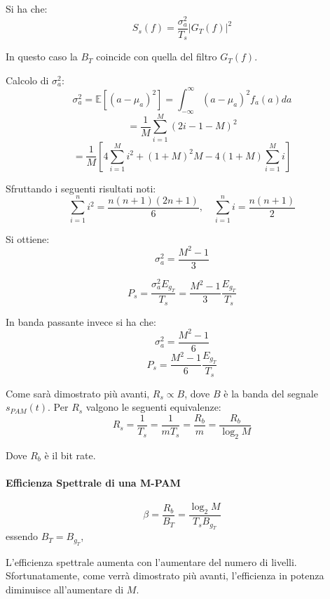 Si ha che:
\[
    S_s(f) = \frac{\sigma_a^2}{T_s} |G_T(f)|^2
\]

In questo caso la $B_T$ coincide con quella del filtro $G_T(f)$.

Calcolo di $\sigma_a^2$:
\[
    \sigma_a^2 = \mathbb{E} \left[ (a - \mu_a)^2 \right] = \int_{-\infty}^{\infty} (a - \mu_a)^2 f_a(a) da
\]
\[
    = \frac{1}{M} \sum_{i=1}^{M} (2i - 1 - M)^2
\]
\[
    = \frac{1}{M} \left[ 4 \sum_{i=1}^{M} i^2 + (1+M)^2 M - 4(1+M) \sum_{i=1}^{M} i \right]
\]

Sfruttando i seguenti risultati noti:
\[
    \sum_{i=1}^{n} i^2 = \frac{n(n+1)(2n+1)}{6}, \quad \sum_{i=1}^{n} i = \frac{n(n+1)}{2}
\]

Si ottiene:
\[
    \sigma_a^2 = \frac{M^2 - 1}{3}
\]


\[
    P_s = \frac{\sigma_a^2 E_{g_T}}{T_s} = \frac{M^2 - 1}{3} \frac{E_{g_T}}{T_s}
\]


In banda passante invece si ha che:
\[
    \sigma_a^2 = \frac{M^2 - 1}{6}
\]
\[
    P_s = \frac{M^2 - 1}{6} \frac{E_{g_T}}{T_s}
\]

Come sarà dimostrato più avanti, $R_s \propto B$, dove $B$ è la banda del segnale $s_{PAM}(t)$. 
Per $R_s$ valgono le seguenti equivalenze:
\[
    R_s = \frac{1}{T_s} = \frac{1}{mT_s} = \frac{R_b}{m} = \frac{R_b}{\log_2 M}
\]

Dove $R_b$ è il bit rate.




\paragraph*{Efficienza Spettrale di una M-PAM}
\[
    \beta = \frac{R_b}{B_T} = \frac{\log_2 M}{T_s B_{g_T}}
\]
essendo \( B_T = B_{g_T} \),

L'efficienza spettrale aumenta con l'aumentare del numero di livelli. Sfortunatamente, come verrà dimostrato più avanti, l'efficienza in potenza diminuisce all'aumentare di \( M \).

